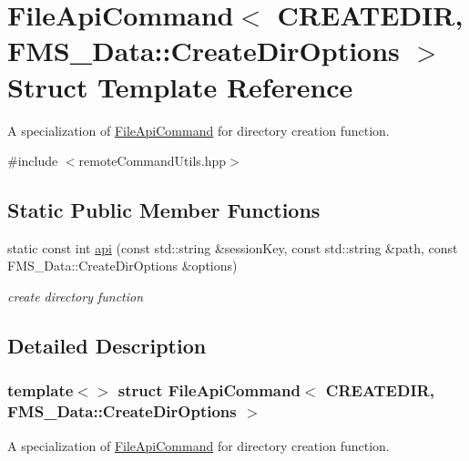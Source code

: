\hypertarget{structFileApiCommand_3_01CREATEDIR_00_01FMS__Data_1_1CreateDirOptions_01_4}{
\section{FileApiCommand$<$ CREATEDIR, FMS\_\-Data::CreateDirOptions $>$ Struct Template Reference}
\label{structFileApiCommand_3_01CREATEDIR_00_01FMS__Data_1_1CreateDirOptions_01_4}
}


A specialization of \hyperlink{structFileApiCommand}{FileApiCommand} for directory creation function.  




{\ttfamily \#include $<$remoteCommandUtils.hpp$>$}

\subsection*{Static Public Member Functions}
\begin{DoxyCompactItemize}
\item 
static const int \hyperlink{structFileApiCommand_3_01CREATEDIR_00_01FMS__Data_1_1CreateDirOptions_01_4_a5c4fffdf154bf9036821d24efbef27f6}{api} (const std::string \&sessionKey, const std::string \&path, const FMS\_\-Data::CreateDirOptions \&options)
\begin{DoxyCompactList}\small\item\em create directory function \item\end{DoxyCompactList}\end{DoxyCompactItemize}


\subsection{Detailed Description}
\subsubsection*{template$<$$>$ struct FileApiCommand$<$ CREATEDIR, FMS\_\-Data::CreateDirOptions $>$}

A specialization of \hyperlink{structFileApiCommand}{FileApiCommand} for directory creation function. 

